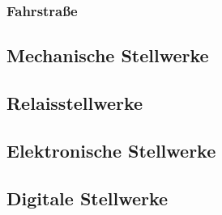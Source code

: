 \subsubsection*{Fahrstraße}\label{text:Grundlagen:Stellwerkstechnik:Sicherung-des-Schienenverkehrs:Fahrstrasse}

\subsection{Mechanische Stellwerke}\label{text:Grundlagen:Stellwerkstechnik:Mechanische-Stellwerke}

\subsection{Relaisstellwerke}\label{text:Grundlagen:Stellwerkstechnik:Relaisstellwerke}

\subsection{Elektronische Stellwerke}\label{text:Grundlagen:Stellwerkstechnik:Elektronische-Stellwerke}

\subsection{Digitale Stellwerke}\label{text:Grundlagen:Stellwerkstechnik:Digitale-Stellwerke}

